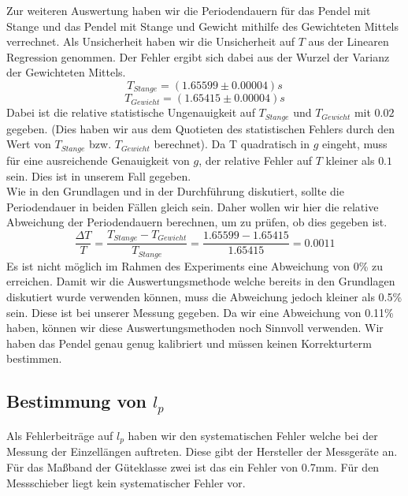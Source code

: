 \documentclass[twoside]{protokoll}
\begin{document}
Zur weiteren Auswertung haben wir die Periodendauern für das Pendel mit Stange und das Pendel mit Stange und Gewicht mithilfe des Gewichteten Mittels verrechnet.
Als Unsicherheit haben wir die Unsicherheit auf $T$ aus der Linearen Regression genommen.
Der Fehler ergibt sich dabei aus der Wurzel der Varianz der Gewichteten Mittels.
\begin{equation}
    T_{Stange} = (1.65599 \pm 0.00004)s
\end{equation}
\begin{equation}
    T_{Gewicht} = (1.65415 \pm 0.00004)s
\end{equation}
Dabei ist die relative statistische Ungenauigkeit auf $T_{Stange}$ und $T_{Gewicht}$ mit $0.02$\textperthousand \quad gegeben. (Dies haben wir aus dem Quotieten des statistischen Fehlers durch den Wert von $T_{Stange}$ bzw. $T_{Gewicht}$ berechnet).
Da T quadratisch in $g$ eingeht, muss für eine ausreichende Genauigkeit von $g$, der relative Fehler auf  $T$ kleiner als $0.1$ \textperthousand sein.
Dies ist in unserem Fall gegeben.\\

Wie in den Grundlagen und in der Durchführung diskutiert, sollte die Periodendauer in beiden Fällen gleich sein.
Daher wollen wir hier die relative Abweichung der Periodendauern berechnen, um zu prüfen, ob dies gegeben ist.
\begin{equation}
    \frac{\Delta T}{T} = \frac{T_{Stange} - T_{Gewicht}}{T_{Stange}} = \frac{1.65599 - 1.65415}{1.65415} = 0.0011
    \label{eq:abweichung_T}
\end{equation}
Es ist nicht möglich im Rahmen des Experiments eine Abweichung von 0\% zu erreichen.
Damit wir die Auswertungsmethode welche bereits in den Grundlagen diskutiert wurde verwenden können, muss die Abweichung jedoch kleiner als 0.5\% sein. 
Diese ist bei unserer Messung gegeben. 
Da wir eine Abweichung von 0.11\% haben, können wir diese Auswertungsmethoden noch Sinnvoll verwenden. 
Wir haben das Pendel genau genug kalibriert und müssen keinen Korrekturterm bestimmen.\\

 
\subsection{Bestimmung von $l_p$}

Als Fehlerbeiträge auf $l_p$ haben wir den systematischen Fehler welche bei der Messung der Einzellängen auftreten.
Diese gibt der Hersteller der Messgeräte an. 
Für das Maßband der Güteklasse zwei ist das ein Fehler von 0.7mm. 
Für den Messschieber liegt kein systematischer Fehler vor.
\end{document}
